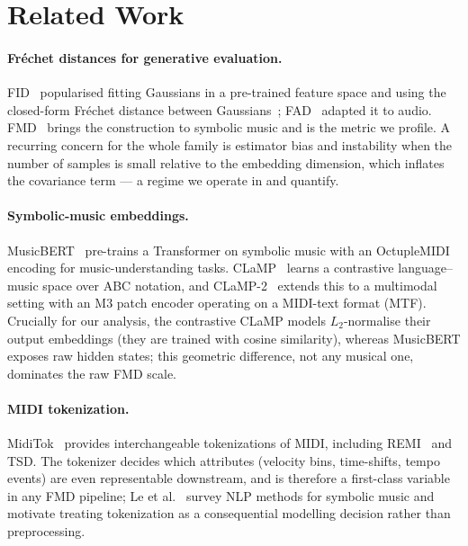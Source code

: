 \documentclass[11pt]{article}
\begin{document}
\section{Related Work}
\paragraph{Fr\'echet distances for generative evaluation.}
FID~\cite{heusel2017fid} popularised fitting Gaussians in a pre-trained
feature space and using the closed-form Fr\'echet distance between
Gaussians~\cite{dowson1982frechet}; FAD~\cite{kilgour2019fad} adapted it to
audio. FMD~\cite{retkowski2025fmd} brings the construction to symbolic
music and is the metric we profile. A recurring concern for the whole
family is estimator bias and instability when the number of samples is
small relative to the embedding dimension, which inflates the covariance
term --- a regime we operate in and quantify.

\paragraph{Symbolic-music embeddings.}
MusicBERT~\cite{zeng2021musicbert} pre-trains a Transformer on symbolic
music with an OctupleMIDI encoding for music-understanding tasks.
CLaMP~\cite{wu2023clamp} learns a contrastive language--music space over
ABC notation, and CLaMP-2~\cite{wu2024clamp2} extends this to a multimodal
setting with an M3 patch encoder operating on a MIDI-text format (MTF).
Crucially for our analysis, the contrastive CLaMP models $L_2$-normalise
their output embeddings (they are trained with cosine similarity), whereas
MusicBERT exposes raw hidden states; this geometric difference, not any
musical one, dominates the raw FMD scale.

\paragraph{MIDI tokenization.}
MidiTok~\cite{fradet2021miditok} provides interchangeable tokenizations of
MIDI, including REMI~\cite{huang2020remi} and TSD. The tokenizer decides
which attributes (velocity bins, time-shifts, tempo events) are even
representable downstream, and is therefore a first-class variable in any
FMD pipeline; Le et al.~\cite{le2024nlpsurvey} survey NLP methods for
symbolic music and motivate treating tokenization as a consequential
modelling decision rather than preprocessing.
\end{document}

